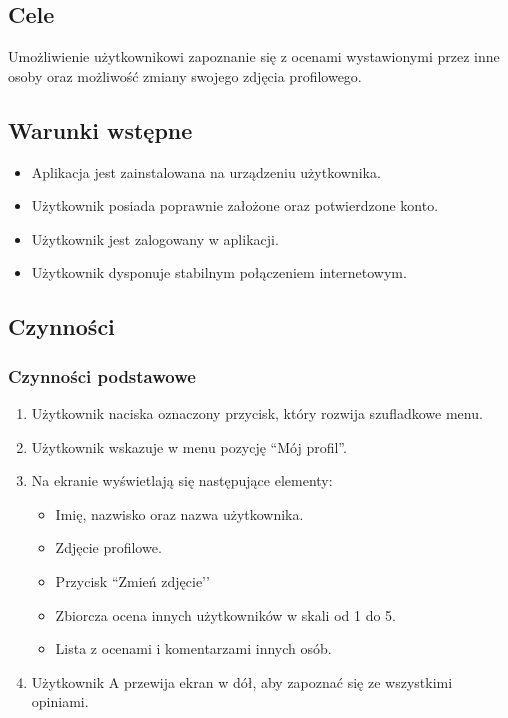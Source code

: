 \documentclass[12pt,a4paper,twoside]{article}
\begin{document}
    
    \subsection{Cele}
    Umożliwienie użytkownikowi zapoznanie się z ocenami wystawionymi przez inne osoby oraz możliwość zmiany swojego zdjęcia profilowego.
    
    
    \subsection{Warunki wstępne}
    \begin{itemize}
        \item Aplikacja jest zainstalowana na urządzeniu użytkownika.
        \item Użytkownik posiada poprawnie założone oraz potwierdzone konto.
        \item Użytkownik jest zalogowany w aplikacji.
        \item Użytkownik dysponuje stabilnym połączeniem internetowym.
    \end{itemize}
    
    \subsection{Czynności}
    
    \subsubsection{Czynności podstawowe}
    
    \begin{enumerate}
        \item Użytkownik naciska oznaczony przycisk, który rozwija szufladkowe menu.
        \item Użytkownik wskazuje w menu pozycję ``Mój profil''.
        \item Na ekranie wyświetlają się następujące elementy:
        \begin{itemize}
            \item Imię, nazwisko oraz nazwa użytkownika.
            \item Zdjęcie profilowe.
            \item Przycisk ``Zmień zdjęcie’’
            \item Zbiorcza ocena innych użytkowników w skali od 1 do 5.
            \item Lista z ocenami i komentarzami innych osób.
        \end{itemize}
        \item Użytkownik A przewija ekran w dół, aby zapoznać się ze wszystkimi opiniami.
    \end{enumerate}
    
\end{document}

